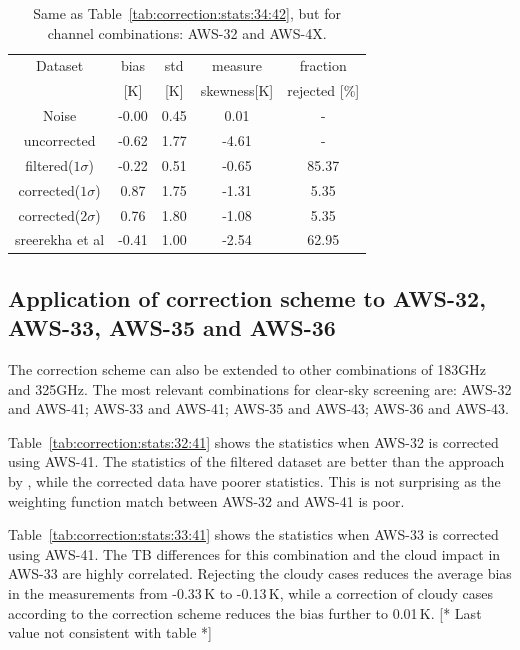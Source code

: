 \documentclass[12pt]{article}
\begin{document}
%
\begin{table}[!h]
	\centering
	\begin{tabular}[b]{c|c|c|c|c}
		Dataset  		  &   bias &   std &   measure & fraction \\
						&   [K]  &   [K] & skewness[K] 		& rejected [\%]\\
		\hline
Noise             		&  -0.00 &  0.45 &               0.01 &                - \\
uncorrected       		&  -0.62 &  1.77 &              -4.61 &                - \\
filtered($1\sigma$)  	&  -0.22 &  0.51 &              -0.65 &               85.37 \\
corrected($1\sigma$) 	&   0.87 &  1.75 &              -1.31 &                5.35 \\
corrected($2\sigma$) 	&   0.76 &  1.80 &              -1.08 &                5.35 \\
sreerekha et al   		&  -0.41 &  1.00 &              -2.54 &               62.95 \\
		\hline
	\end{tabular}
	\caption{Same as Table~\ref{tab:correction:stats:34:42}, but for channel combinations: AWS-32 and AWS-4X.   }
	\label{tab:correction:stats:32:4X}
\end{table}

\subsection{Application of correction scheme to AWS-32, AWS-33, AWS-35 and AWS-36}
%
The correction scheme can also be extended to other combinations of 183GHz and
325GHz. The most relevant combinations for clear-sky screening are: AWS-32 and
AWS-41; AWS-33 and AWS-41; AWS-35 and AWS-43; AWS-36 and AWS-43.

Table~\ref{tab:correction:stats:32:41} shows the statistics when AWS-32 is
corrected using AWS-41. The statistics of the filtered dataset are better than
the approach by \cite{rekha2012potential}, while the corrected data have poorer
statistics. This is not surprising as the weighting function match between 
AWS-32 and  AWS-41 is poor.

Table~\ref{tab:correction:stats:33:41} shows the statistics when AWS-33 is
corrected using AWS-41. The TB differences for this combination and the cloud
impact in AWS-33 are highly correlated. Rejecting the cloudy cases reduces the
average bias in the measurements from -0.33\,K to -0.13\,K, while a correction
of cloudy cases according to the correction scheme reduces the bias further to
0.01\,K. [* Last value not consistent with table *]
\end{document}
